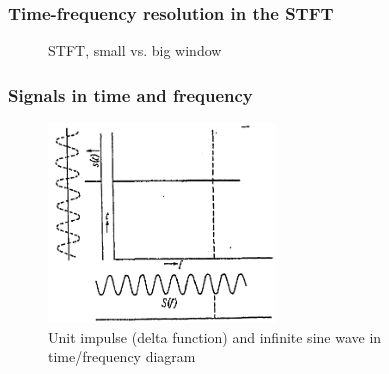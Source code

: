 \documentclass{beamer}
\begin{document}
\begin{frame}
	\frametitle{Time-frequency resolution in the STFT}
	\begin{figure}
		\centering
		\caption{STFT, small vs. big window}
	\end{figure}
\end{frame}

\begin{frame}
	\frametitle{Signals in time and frequency}
	\begin{figure}
		\centering
		\includegraphics[width=6cm]{./gabor1.png}
		\caption{Unit impulse (delta function) and infinite sine wave in time/frequency diagram}
	\end{figure}
\end{frame}
\end{document}
